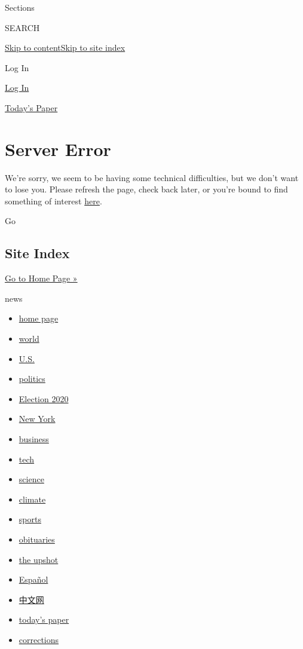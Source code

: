 Sections

SEARCH

\protect\hyperlink{site-content}{Skip to
content}\protect\hyperlink{site-index}{Skip to site index}

Log In

\href{https://myaccount.stg.nytimes.com/auth/login?response_type=cookie\&client_id=vi}{Log
In}

\href{https://www.nytimes.com/section/todayspaper}{Today's Paper}

\hypertarget{server-error}{%
\section{Server Error}\label{server-error}}

We're sorry, we seem to be having some technical difficulties, but we
don't want to lose you. Please refresh the page, check back later, or
you're bound to find something of interest \href{/}{here}.

Go

\hypertarget{site-index}{%
\subsection{Site Index}\label{site-index}}

\href{/}{Go to Home Page »}

news

\begin{itemize}
\tightlist
\item
  \href{https://www.nytimes.com}{home page}
\item
  \href{https://www.nytimes.com/section/world}{world}
\item
  \href{https://www.nytimes.com/section/us}{U.S.}
\item
  \href{https://www.nytimes.com/section/politics}{politics}
\item
  \href{https://www.nytimes.com/news-event/2020-election}{Election 2020}
\item
  \href{https://www.nytimes.com/section/nyregion}{New York}
\item
  \href{https://www.nytimes.com/section/business}{business}
\item
  \href{https://www.nytimes.com/section/technology}{tech}
\item
  \href{https://www.nytimes.com/section/science}{science}
\item
  \href{https://www.nytimes.com/section/climate}{climate}
\item
  \href{https://www.nytimes.com/section/sports}{sports}
\item
  \href{https://www.nytimes.com/section/obituaries}{obituaries}
\item
  \href{https://www.nytimes.com/section/upshot}{the upshot}
\item
  \href{https://www.nytimes.com/es/}{Español}
\item
  \href{https://cn.nytimes.com/}{中文网}
\item
  \href{https://www.nytimes.com/section/todayspaper}{today's paper}
\item
  \href{https://www.nytimes.com/section/corrections}{corrections}
\end{itemize}

